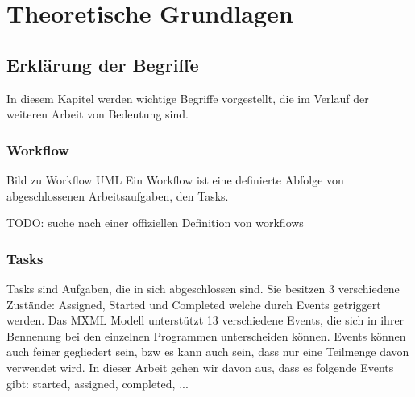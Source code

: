 
\chapter{Theoretische Grundlagen} %

\label{Chapter2} %


\section{Erklärung der Begriffe}
 In diesem Kapitel werden wichtige Begriffe vorgestellt, die im Verlauf der weiteren Arbeit von Bedeutung sind.

\subsection{Workflow}

Bild zu Workflow UML
Ein Workflow ist eine definierte Abfolge von abgeschlossenen Arbeitsaufgaben, den Tasks. 

TODO: suche nach einer offiziellen Definition von workflows

\subsection{Tasks}

Tasks sind Aufgaben, die in sich abgeschlossen sind. Sie besitzen 3 verschiedene Zustände: Assigned, Started und Completed welche durch Events getriggert werden. Das MXML Modell unterstützt 13 verschiedene Events, die sich in ihrer Bennenung bei den einzelnen Programmen unterscheiden können. Events können auch feiner gegliedert sein, bzw es kann auch sein, dass nur eine Teilmenge davon verwendet wird. In dieser Arbeit gehen wir davon aus, dass es folgende Events gibt: started, assigned, completed, ...

